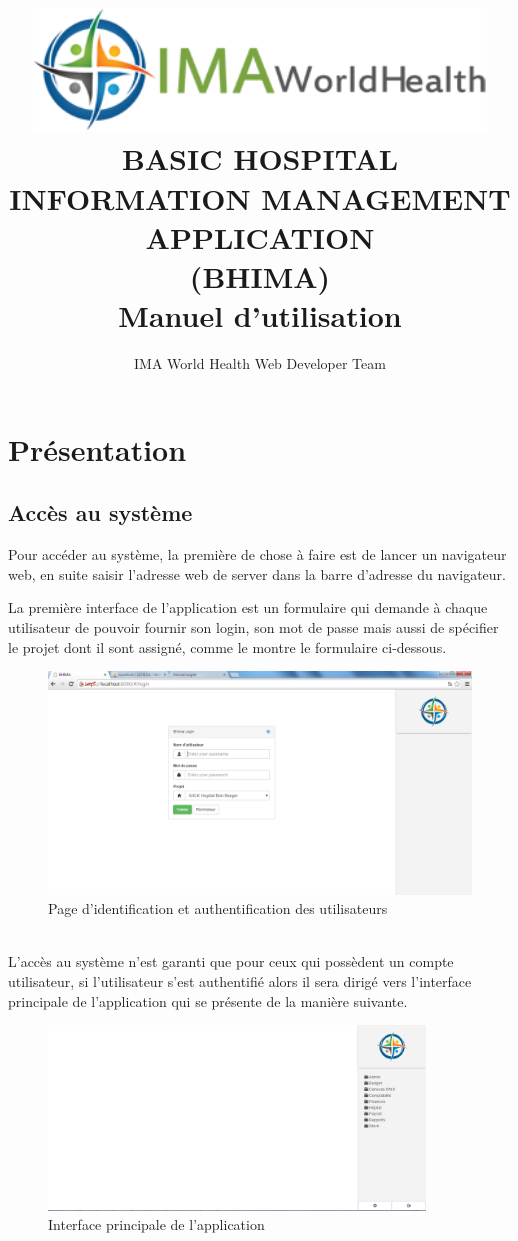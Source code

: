 \documentclass[12pt,a4paper]{report}
\author{IMA World Health Web Developer Team}
\title{\includegraphics[width=12cm]{ima.png} \\BASIC HOSPITAL INFORMATION MANAGEMENT APPLICATION\\ (BHIMA) \\ Manuel d'utilisation}
\begin{document}
\maketitle 
\chapter{Présentation}
\section{Accès au système}
\large{Pour accéder au système, la première de chose à faire est de lancer un navigateur web, en suite saisir l'adresse web de server dans la barre d'adresse du navigateur.}

La première interface de l'application est un formulaire qui demande à chaque utilisateur de pouvoir fournir son login, son mot de passe mais aussi de spécifier  le projet dont il sont assigné, comme le montre le formulaire ci-dessous.
\begin{figure}[h]
\begin{center}
\includegraphics[width=12cm]{pic/login.png}
\end{center}
\caption{Page d'identification et authentification des utilisateurs}
\label{Page d'identification et authentification des utilisateurs}
\end{figure}
\\ L'accès au système n'est garanti que pour ceux qui possèdent un compte utilisateur, si l'utilisateur s'est authentifié alors il sera dirigé vers l'interface principale de l'application qui se présente de la manière suivante.
\newpage
\begin{figure}[h]
\begin{center} 
\includegraphics[width=10cm]{pic/mainInterface.png}
\end{center}
\caption{Interface principale de l'application}
\label{Interface principale de l'application}
\end{figure} 
\end{document}
